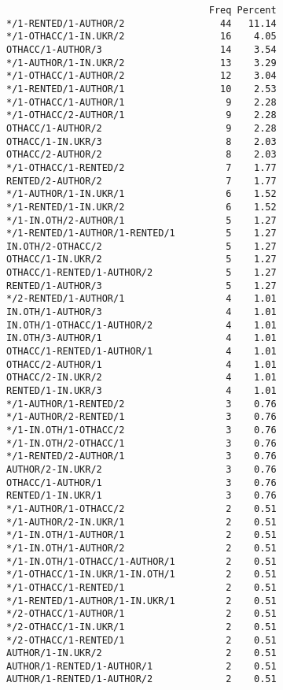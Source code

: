 \documentclass[
  letterpaper,
  DIV=11,
  numbers=noendperiod]{scrreprt}
\begin{document}
\begin{verbatim}
                                    Freq Percent
*/1-RENTED/1-AUTHOR/2                 44   11.14
*/1-OTHACC/1-IN.UKR/2                 16    4.05
OTHACC/1-AUTHOR/3                     14    3.54
*/1-AUTHOR/1-IN.UKR/2                 13    3.29
*/1-OTHACC/1-AUTHOR/2                 12    3.04
*/1-RENTED/1-AUTHOR/1                 10    2.53
*/1-OTHACC/1-AUTHOR/1                  9    2.28
*/1-OTHACC/2-AUTHOR/1                  9    2.28
OTHACC/1-AUTHOR/2                      9    2.28
OTHACC/1-IN.UKR/3                      8    2.03
OTHACC/2-AUTHOR/2                      8    2.03
*/1-OTHACC/1-RENTED/2                  7    1.77
RENTED/2-AUTHOR/2                      7    1.77
*/1-AUTHOR/1-IN.UKR/1                  6    1.52
*/1-RENTED/1-IN.UKR/2                  6    1.52
*/1-IN.OTH/2-AUTHOR/1                  5    1.27
*/1-RENTED/1-AUTHOR/1-RENTED/1         5    1.27
IN.OTH/2-OTHACC/2                      5    1.27
OTHACC/1-IN.UKR/2                      5    1.27
OTHACC/1-RENTED/1-AUTHOR/2             5    1.27
RENTED/1-AUTHOR/3                      5    1.27
*/2-RENTED/1-AUTHOR/1                  4    1.01
IN.OTH/1-AUTHOR/3                      4    1.01
IN.OTH/1-OTHACC/1-AUTHOR/2             4    1.01
IN.OTH/3-AUTHOR/1                      4    1.01
OTHACC/1-RENTED/1-AUTHOR/1             4    1.01
OTHACC/2-AUTHOR/1                      4    1.01
OTHACC/2-IN.UKR/2                      4    1.01
RENTED/1-IN.UKR/3                      4    1.01
*/1-AUTHOR/1-RENTED/2                  3    0.76
*/1-AUTHOR/2-RENTED/1                  3    0.76
*/1-IN.OTH/1-OTHACC/2                  3    0.76
*/1-IN.OTH/2-OTHACC/1                  3    0.76
*/1-RENTED/2-AUTHOR/1                  3    0.76
AUTHOR/2-IN.UKR/2                      3    0.76
OTHACC/1-AUTHOR/1                      3    0.76
RENTED/1-IN.UKR/1                      3    0.76
*/1-AUTHOR/1-OTHACC/2                  2    0.51
*/1-AUTHOR/2-IN.UKR/1                  2    0.51
*/1-IN.OTH/1-AUTHOR/1                  2    0.51
*/1-IN.OTH/1-AUTHOR/2                  2    0.51
*/1-IN.OTH/1-OTHACC/1-AUTHOR/1         2    0.51
*/1-OTHACC/1-IN.UKR/1-IN.OTH/1         2    0.51
*/1-OTHACC/1-RENTED/1                  2    0.51
*/1-RENTED/1-AUTHOR/1-IN.UKR/1         2    0.51
*/2-OTHACC/1-AUTHOR/1                  2    0.51
*/2-OTHACC/1-IN.UKR/1                  2    0.51
*/2-OTHACC/1-RENTED/1                  2    0.51
AUTHOR/1-IN.UKR/2                      2    0.51
AUTHOR/1-RENTED/1-AUTHOR/1             2    0.51
AUTHOR/1-RENTED/1-AUTHOR/2             2    0.51

\end{verbatim}
\end{document}
